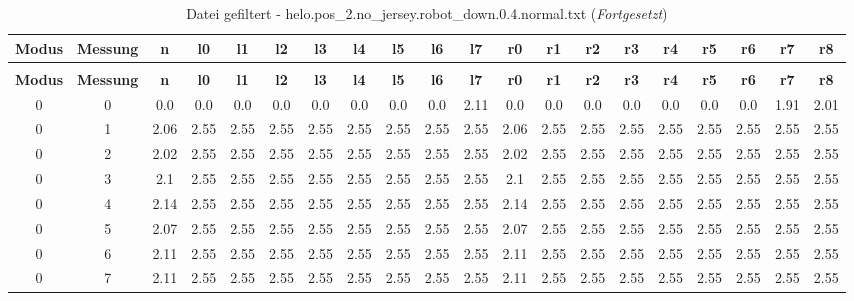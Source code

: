 \begin{landscape}
\begin{longtable}{|c|c||c||c|c|c|c|c|c|c|c||c|c|c|c|c|c|c|c|c|}
	\caption{Datei gefiltert - helo.pos\_2.no\_jersey.robot\_down.0.4.normal.txt} \label{tab:helo.pos-2.no-jersey.robot-down.0.4.normal.txt} \\ \hline
	\textbf{Modus} & \textbf{Messung} & \textbf{n} & \textbf{l0} & \textbf{l1} & \textbf{l2} & \textbf{l3} & \textbf{l4} & \textbf{l5} & \textbf{l6} & \textbf{l7} & \textbf{r0} & \textbf{r1} & \textbf{r2} & \textbf{r3} & \textbf{r4} & \textbf{r5} & \textbf{r6} & \textbf{r7} & \textbf{r8}\\ \hline
	\endfirsthead
	\caption[]{Datei gefiltert - helo.pos\_2.no\_jersey.robot\_down.0.4.normal.txt (\emph{Fortgesetzt})} \\ \hline
	\textbf{Modus} & \textbf{Messung} & \textbf{n} & \textbf{l0} & \textbf{l1} & \textbf{l2} & \textbf{l3} & \textbf{l4} & \textbf{l5} & \textbf{l6} & \textbf{l7} & \textbf{r0} & \textbf{r1} & \textbf{r2} & \textbf{r3} & \textbf{r4} & \textbf{r5} & \textbf{r6} & \textbf{r7} & \textbf{r8}\\ \hline
	\endhead
	0 & 0 & 0.0 & 0.0 & 0.0 & 0.0 & 0.0 & 0.0 & 0.0 & 0.0 & 2.11 & 0.0 & 0.0 & 0.0 & 0.0 & 0.0 & 0.0 & 0.0 & 1.91 & 2.01 \\ \hline
	0 & 1 & 2.06 & 2.55 & 2.55 & 2.55 & 2.55 & 2.55 & 2.55 & 2.55 & 2.55 & 2.06 & 2.55 & 2.55 & 2.55 & 2.55 & 2.55 & 2.55 & 2.55 & 2.55 \\ \hline
	0 & 2 & 2.02 & 2.55 & 2.55 & 2.55 & 2.55 & 2.55 & 2.55 & 2.55 & 2.55 & 2.02 & 2.55 & 2.55 & 2.55 & 2.55 & 2.55 & 2.55 & 2.55 & 2.55 \\ \hline
	0 & 3 & 2.1 & 2.55 & 2.55 & 2.55 & 2.55 & 2.55 & 2.55 & 2.55 & 2.55 & 2.1 & 2.55 & 2.55 & 2.55 & 2.55 & 2.55 & 2.55 & 2.55 & 2.55 \\ \hline
	0 & 4 & 2.14 & 2.55 & 2.55 & 2.55 & 2.55 & 2.55 & 2.55 & 2.55 & 2.55 & 2.14 & 2.55 & 2.55 & 2.55 & 2.55 & 2.55 & 2.55 & 2.55 & 2.55 \\ \hline
	0 & 5 & 2.07 & 2.55 & 2.55 & 2.55 & 2.55 & 2.55 & 2.55 & 2.55 & 2.55 & 2.07 & 2.55 & 2.55 & 2.55 & 2.55 & 2.55 & 2.55 & 2.55 & 2.55 \\ \hline
	0 & 6 & 2.11 & 2.55 & 2.55 & 2.55 & 2.55 & 2.55 & 2.55 & 2.55 & 2.55 & 2.11 & 2.55 & 2.55 & 2.55 & 2.55 & 2.55 & 2.55 & 2.55 & 2.55 \\ \hline
	0 & 7 & 2.11 & 2.55 & 2.55 & 2.55 & 2.55 & 2.55 & 2.55 & 2.55 & 2.55 & 2.11 & 2.55 & 2.55 & 2.55 & 2.55 & 2.55 & 2.55 & 2.55 & 2.55 \\ \hline

\end{longtable}
\end{landscape}
